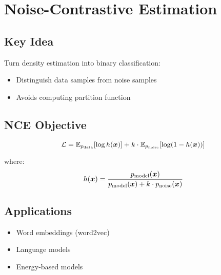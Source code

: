 
\section{Noise-Contrastive Estimation}
\label{sec:nce}

\subsection{Key Idea}

Turn density estimation into binary classification:
\begin{itemize}
    \item Distinguish data samples from noise samples
    \item Avoids computing partition function
\end{itemize}

\subsection{NCE Objective}

\begin{equation}
\mathcal{L} = \mathbb{E}_{p_{\text{data}}}[\log h(\boldsymbol{x})] + k \cdot \mathbb{E}_{p_{\text{noise}}}[\log(1-h(\boldsymbol{x}))]
\end{equation}

where:
\begin{equation}
h(\boldsymbol{x}) = \frac{p_{\text{model}}(\boldsymbol{x})}{p_{\text{model}}(\boldsymbol{x}) + k \cdot p_{\text{noise}}(\boldsymbol{x})}
\end{equation}

\subsection{Applications}

\begin{itemize}
    \item Word embeddings (word2vec)
    \item Language models
    \item Energy-based models
\end{itemize}

